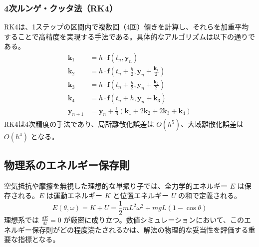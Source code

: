 \documentclass{article}
\begin{document}
\subsubsection{4次ルンゲ・クッタ法（RK4）}
RK4は、1ステップの区間内で複数回（4回）傾きを計算し、それらを加重平均することで高精度を実現する手法である。具体的なアルゴリズムは以下の通りである。
\begin{align*}
\mathbf{k}_1 &= h \cdot \mathbf{f}(t_n, \mathbf{y}_n) \\
\mathbf{k}_2 &= h \cdot \mathbf{f}\left(t_n + \frac{h}{2}, \mathbf{y}_n + \frac{\mathbf{k}_1}{2}\right) \\
\mathbf{k}_3 &= h \cdot \mathbf{f}\left(t_n + \frac{h}{2}, \mathbf{y}_n + \frac{\mathbf{k}_2}{2}\right) \\
\mathbf{k}_4 &= h \cdot \mathbf{f}(t_n + h, \mathbf{y}_n + \mathbf{k}_3) \\
\mathbf{y}_{n+1} &= \mathbf{y}_n + \frac{1}{6}(\mathbf{k}_1 + 2\mathbf{k}_2 + 2\mathbf{k}_3 + \mathbf{k}_4)
\end{align*}
RK4は4次精度の手法であり、局所離散化誤差は $O(h^5)$、大域離散化誤差は $O(h^4)$ となる。

\subsection{物理系のエネルギー保存則}
空気抵抗や摩擦を無視した理想的な単振り子では、全力学的エネルギー $E$ は保存される。$E$ は運動エネルギー $K$ と位置エネルギー $U$ の和で定義される。
$$E(\theta, \omega) = K + U = \frac{1}{2}mL^2\omega^2 + mgL(1-\cos\theta)$$
理想系では $\frac{dE}{dt} = 0$ が厳密に成り立つ。数値シミュレーションにおいて、このエネルギー保存則がどの程度満たされるかは、解法の物理的な妥当性を評価する重要な指標となる。
\end{document}
